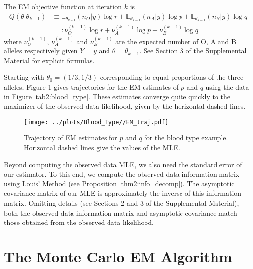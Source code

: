 \documentclass[ss]{imsart}
\theoremstyle{plain}
\theoremstyle{definition}
\theoremstyle{remark}
\newcommand{\bE}{\mathbb{E}}
\begin{document}
The EM objective function at iteration $k$ is
%
\begin{align}
    Q(\theta|\theta_{k-1}) &\equiv  \bE_{\theta_{k-1}}(n_O | y) \log r + \bE_{\theta_{k-1}}(n_A | y) \log p + \bE_{\theta_{k-1}}(n_B | y) \log q\\
    &=: \nu^{(k-1)}_O \log r + \nu^{(k-1)}_A \log p + \nu^{(k-1)}_B \log q
\end{align}
%
where $\nu^{(k-1)}_O$, $\nu^{(k-1)}_A$ and $\nu^{(k-1)}_B$ are the expected number of O, A and B alleles respectively given $Y=y$ and $\theta = \theta_{k-1}$. See Section 3 of the Supplemental Material for explicit formulas. %

Starting with $\theta_0 = (1/3, 1/3)$ corresponding to equal proportions of the three alleles, Figure \ref{fig:blood_EM_traj} gives trajectories for the EM estimates of $p$ and $q$ using the data in Figure \ref{tab2:blood_type}. These estimates converge quite quickly to the maximizer of the observed data likelihood, given by the horizontal dashed lines.
%
\begin{figure}
    \centering
    \caption{Trajectory of EM estimates for $p$ and $q$ for the blood type example. Horizontal dashed lines give the values of the MLE.}
    \label{fig:blood_EM_traj}
    \texttt{[image: ../plots/Blood\_Type//EM\_traj.pdf]}
\end{figure}
%
Beyond computing the observed data MLE, we also need the standard error of our estimator. To this end, we compute the observed data information matrix using Louis' Method (see Proposition \ref{thm2:info_decomp}). The asymptotic covariance matrix of our MLE is approximately the inverse of this information matrix. Omitting details (see Sections 2 and 3 of the Supplemental Material), both the observed data information matrix and asymptotic covariance match those obtained from the observed data likelihood. 
%


\section{The Monte Carlo EM Algorithm}
\label{sec:MCEM}
\end{document}
